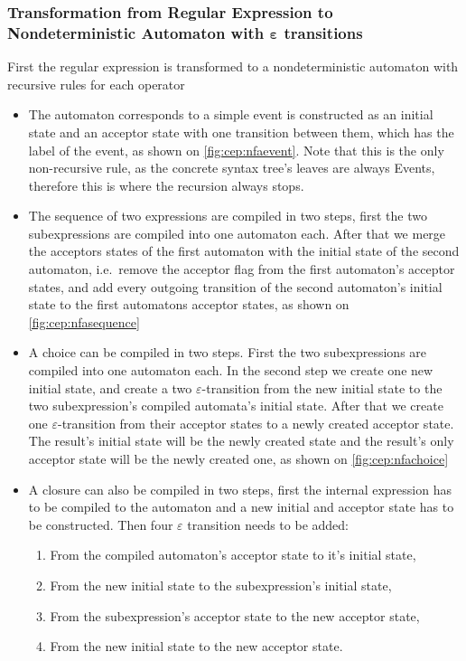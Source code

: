 			\subsubsection{Transformation from Regular Expression to Nondeterministic Automaton with $\bm{\varepsilon}$ transitions}
			\label{section:re2nfa}
			First the regular expression is transformed to a nondeterministic automaton with recursive rules for each operator
			\begin{itemize}
				\item The automaton corresponds to a simple event is constructed as an initial state and an acceptor state with one transition between them, which has the label of the event, as shown on \cref{fig:cep:nfaevent}. Note that this is the only non-recursive rule, as the concrete syntax tree's leaves are always Events, therefore this is where the recursion always stops.
				\item The sequence of two expressions are compiled in two steps, first the two subexpressions are compiled into one automaton each. After that we merge the acceptors states of the first automaton with the initial state of the second automaton, i.e.~remove the acceptor flag from the first automaton's acceptor states, and add every outgoing transition of the second automaton's initial state to the first automatons acceptor states, as shown on \cref{fig:cep:nfasequence}
				\item A choice can be compiled in two steps. First the two subexpressions are compiled into one automaton each. In the second step we create one new initial state, and create a two $\varepsilon$-transition from the new initial state to the two subexpression's compiled automata's initial state. After that we create one $\varepsilon$-transition from their acceptor states to a newly created acceptor state. The result's initial state will be the newly created state and the result's only acceptor state will be the newly created one, as shown on \cref{fig:cep:nfachoice}
				\item A closure can also be compiled in two steps, first the internal expression has to be compiled to the automaton and a new initial and acceptor state has to be constructed. Then four $\varepsilon$ transition needs to be added:
				\begin{enumerate}
					\item From the compiled automaton's acceptor state to it's initial state,
					\item From the new initial state to the subexpression's initial state,
					\item From the subexpression's acceptor state to the new acceptor state,
					\item From the new initial state to the new acceptor state.
				\end{enumerate}
			\end{itemize}
		
